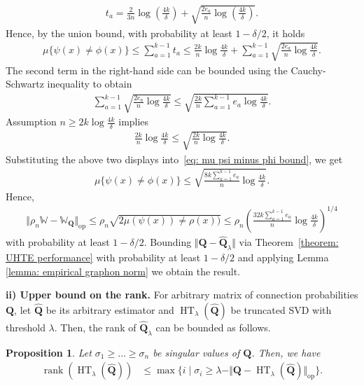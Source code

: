 \documentclass[11pt]{article}
\newcommand{\op}{\mathrm{op}}
\newcommand{\bQ}{\bm{Q}}
\newcommand{\bbW}{\mathbb{W}}
\newcommand{\<}{\langle}
\renewcommand{\>}{\rangle}
\DeclareMathOperator{\rank}{rank}
\theoremstyle{plain}
\newtheorem{prop}{Proposition}
\theoremstyle{definition}
\theoremstyle{remark}
\begin{document}
{\begin{align*}
    t_a = \frac{2}{3n} \log \left( \frac{4k}{\delta} \right) + \sqrt{\frac{2 e_a}{n} \log \left ( \frac{4 k}{\delta}\right )}.
\end{align*}
Hence, by the union bound, with probability at least $1 - \delta/2$, it holds
\begin{align}
\label{eq: mu psi minus phi bound}
    \mu \{ \psi(x) \neq \phi(x)\} \le \sum_{a = 1}^{k-1} t_a \leq \frac{2k}{n} \log \frac{4k}{\delta} + \sum_{a = 1}^{k - 1} \sqrt{\frac{2e_a}{n} \log \frac{4k}{\delta}}.
\end{align}
The second term in the right-hand side can be bounded using the Cauchy-Schwartz inequality to obtain
\begin{align*}
    \sum_{a = 1}^{k - 1} \sqrt{\frac{2e_a}{n} \log \frac{4k}{\delta}} \leq \sqrt{\frac{2k }{n} \sum_{a = 1}^{k-1} e_a \log \frac{4k}{\delta}}.
\end{align*}
Assumption $n \ge 2 k \log \frac{4k}{\delta}$ implies
\begin{align*}
    \frac{2k}{n} \log \frac{4k}{\delta} \leq \sqrt{\frac{2 k}{n} \log \frac{4k}{\delta}}. 
\end{align*}
Substituting the above two displays into~\eqref{eq: mu psi minus phi bound}, we get
\begin{align*}
    \mu \{ \psi(x) \neq \phi(x)\} \leq \sqrt{\frac{8k \sum_{a = 1}^{k - 1} e_a}{n} \log \frac{4k}{\delta}}. 
\end{align*}
Hence,  
\begin{align}
\label{eq: error of connection probabilities graphon}
    \Vert \rho_n \bbW - \bbW_{\bQ} \Vert_{\op} \le \rho_n \sqrt{2 \mu(\psi(x)) \neq \rho(x))} \leq \rho_n \left (\frac{32 k \sum_{a = 1}^{k - 1} e_a}{n} \log \frac{4k}{\delta}\right )^{1/4}
\end{align}
with probability at least $1 - \delta/2$.
Bounding $\Vert \bQ - \widehat{\bQ}_\lambda \Vert$ via Theorem~\ref{theorem: UHTE performance} with probability at least $1 - \delta/2$ and applying Lemma \ref{lemma: empirical graphon norm} we obtain the result.


\textbf{ii) Upper bound on the rank.} For arbitrary matrix of connection probabilities $\bQ$, let $\widehat{\bQ}$ be its arbitrary estimator and $\operatorname{HT}_{\lambda}(\widehat{\bQ})$ be truncated SVD with threshold $\lambda$. Then, the rank of $\widehat{\bQ}_\lambda$ can be bounded as follows.
\begin{prop}
\label{proposition: singular value rank}
	Let $\sigma_1 \ge \ldots \ge \sigma_n$ be singular values of $\bQ$. Then, we have
	\begin{align*}
		\rank(\operatorname{HT}_{\lambda}(\widehat{\bQ})) & \le \max \{i \mid \sigma_i \ge \lambda -\Vert \bQ -\operatorname{HT}_{\lambda}(\widehat{\bQ}) \Vert_{\op}\}.
	\end{align*}	
	

\end{prop}}
\end{document}
